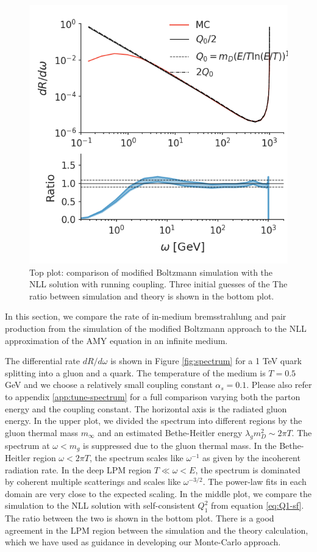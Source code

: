 \documentclass[aps, prc, reprint, amsmath, groupedaddress, nofootinbib]{revtex4-1}
\begin{document}
\begin{figure}
\includegraphics[width=\columnwidth]{running.png}
\caption{Top plot: comparison of modified Boltzmann simulation with the NLL solution  with running coupling.
Three initial guesses of the 
The ratio between simulation and theory is shown in the bottom plot.}
\label{fig:running}
\end{figure}

In this section, we compare the rate of in-medium bremsstrahlung and pair production from the simulation of the modified Boltzmann approach to the NLL approximation of the AMY equation in an infinite medium.

The differential rate $dR/d\omega$ is shown in Figure \ref{fig:spectrum} for a 1 TeV quark splitting into a gluon and a quark.
The temperature of the medium is $T=0.5$ GeV and we choose a relatively small coupling constant $\alpha_s = 0.1$.
Please also refer to appendix \ref{app:tune-spectrum} for a full comparison varying both the parton energy and the coupling constant.
The horizontal axis is the radiated gluon energy.
In the upper plot, we divided the spectrum into different regions by the gluon thermal mass $m_\infty$ and an estimated Bethe-Heitler energy $\lambda_g m_D^2 \sim 2\pi T$.
The spectrum at $\omega < m_g$ is suppressed due to the gluon thermal mass.
In the Bethe-Heitler region $\omega < 2\pi T$, the spectrum scales like $\omega^{-1}$ as given by the incoherent radiation rate.
In the deep LPM region $T \ll \omega < E$, the spectrum is dominated by coherent multiple scatterings and scales like $\omega^{-3/2}$.
The power-law fits in each domain are very close to the expected scaling.
In the middle plot, we compare the simulation to the NLL solution with self-consistent $Q_1^2$ from equation \ref{eq:Q1-sf}. 
The ratio between the two is shown in the bottom plot.
There is a good agreement in the LPM region between the simulation and the theory calculation, which we have used as guidance in developing our Monte-Carlo approach.
\end{document}
